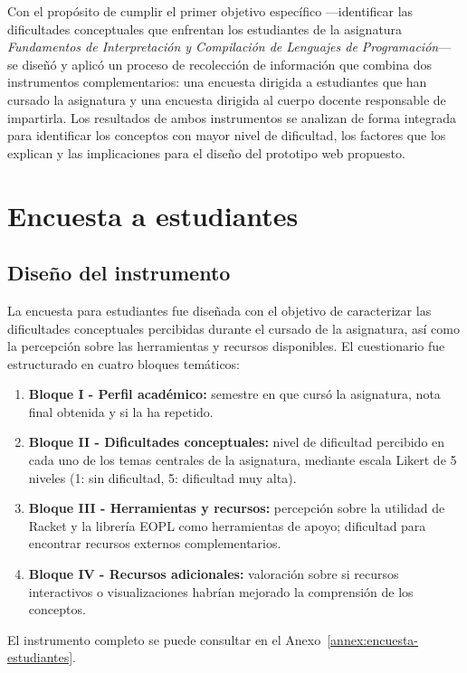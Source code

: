 Con el propósito de cumplir el primer objetivo específico —identificar las dificultades conceptuales que enfrentan los estudiantes de la asignatura \textit{Fundamentos de Interpretación y Compilación de Lenguajes de Programación}— se diseñó y aplicó un proceso de recolección de información que combina dos instrumentos complementarios: una encuesta dirigida a estudiantes que han cursado la asignatura y una encuesta dirigida al cuerpo docente responsable de impartirla. Los resultados de ambos instrumentos se analizan de forma integrada para identificar los conceptos con mayor nivel de dificultad, los factores que los explican y las implicaciones para el diseño del prototipo web propuesto.

\section{Encuesta a estudiantes}

\subsection{Diseño del instrumento}

La encuesta para estudiantes fue diseñada con el objetivo de caracterizar las dificultades conceptuales percibidas durante el cursado de la asignatura, así como la percepción sobre las herramientas y recursos disponibles. El cuestionario fue estructurado en cuatro bloques temáticos:

\begin{enumerate}
    \item \textbf{Bloque I - Perfil académico:} semestre en que cursó la asignatura, nota final obtenida y si la ha repetido.
    \item \textbf{Bloque II - Dificultades conceptuales:} nivel de dificultad percibido en cada uno de los temas centrales de la asignatura, mediante escala Likert de 5 niveles (1: sin dificultad, 5: dificultad muy alta).
    \item \textbf{Bloque III - Herramientas y recursos:} percepción sobre la utilidad de Racket y la librería EOPL como herramientas de apoyo; dificultad para encontrar recursos externos complementarios.
    \item \textbf{Bloque IV - Recursos adicionales:} valoración sobre si recursos interactivos o visualizaciones habrían mejorado la comprensión de los conceptos.
\end{enumerate}

El instrumento completo se puede consultar en el Anexo~\ref{annex:encuesta-estudiantes}.

